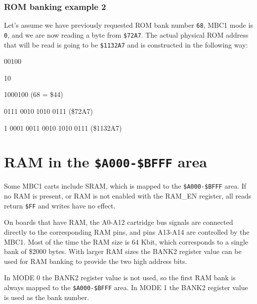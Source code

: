 \subsubsection{ROM banking example 2}

Let's assume we have previously requested ROM bank number \texttt{68}, MBC1
mode is \texttt{0}, and we are now reading a byte from \texttt{\$72A7}. The
actual physical ROM address that will be read is going to be \texttt{\$1132A7}
and is constructed in the following way:

\begin{description}[leftmargin=15em,style=nextline]
  \item[Value of the BANK1 register]
  {
    \ttfamily
    \colorbox{blue!30}{00100}
  }
  \item[Value of the BANK2 register]
  {
    \ttfamily
    \colorbox{red!30}{10}
  }
  \item[ROM bank number]
  {
    \ttfamily
    \colorbox{red!30}{10}\colorbox{blue!30}{00100} (68 = \$44)
  }
  \item[Address being read]
  {
    \ttfamily
    \colorbox{gray!10}{01}\colorbox{green!30}{11 0010 1010 0111} (\$72A7)
  }
  \item[Actual physical ROM address]
  {
    \ttfamily
    \colorbox{red!30}{1 0}\colorbox{blue!30}{001 00}\colorbox{green!30}{11 0010 1010 0111} (\$1132A7)
  }
\end{description}

\section{RAM in the \texttt{\$A000-\$BFFF} area}

Some MBC1 carts include SRAM, which is mapped to the \texttt{\$A000-\$BFFF}
area. If no RAM is present, or RAM is not enabled with the RAM\_EN register,
all reads return \texttt{\$FF} and writes have no effect.

On boards that have RAM, the A0-A12 cartridge bus signals are connected
directly to the corresponding RAM pins, and pins A13-A14 are controlled by the
MBC1. Most of the time the RAM size is 64 Kbit, which corresponds to a single
bank of \$2000 bytes. With larger RAM sizes the BANK2 register value can be
used for RAM banking to provide the two high address bits.

In MODE 0 the BANK2 register value is not used, so the first RAM bank is always
mapped to the \texttt{\$A000-\$BFFF} area. In MODE 1 the BANK2 register value
is used as the bank number.


